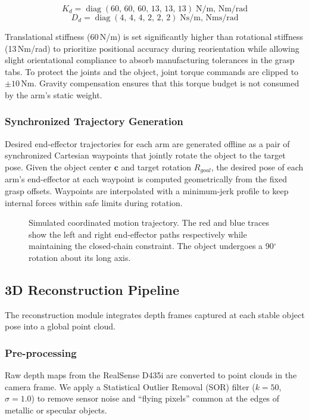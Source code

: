 \documentclass[letterpaper, 10 pt, conference]{ieeeconf}  %
\begin{document}
\begin{equation}
    K_d = \operatorname{diag}(60,\,60,\,60,\,13,\,13,\,13)\;\text{N/m, Nm/rad}
\end{equation}
\begin{equation}
    D_d = \operatorname{diag}(4,\,4,\,4,\,2,\,2,\,2)\;\text{Ns/m, Nms/rad}
\end{equation}

Translational stiffness (60\,N/m) is set significantly higher than rotational
stiffness (13\,Nm/rad) to prioritize positional accuracy during reorientation
while allowing slight orientational compliance to absorb manufacturing
tolerances in the grasp tabs. To protect the joints and the object, joint
torque commands are clipped to $\pm 10$\,Nm. Gravity compensation ensures that
this torque budget is not consumed by the arm's static weight.

\subsubsection{Synchronized Trajectory Generation}

Desired end-effector trajectories for each arm are generated offline as a
pair of synchronized Cartesian waypoints that jointly rotate the object to the
target pose. Given the object center $\bm{c}$ and target rotation $R_{goal}$,
the desired pose of each arm's end-effector at each waypoint is computed
geometrically from the fixed grasp offsets. Waypoints are interpolated with a
minimum-jerk profile to keep internal forces within safe limits during
rotation.

\begin{figure}[thpb]
   \centering
   \framebox{\parbox{3in}{}}
   \caption{Simulated coordinated motion trajectory. The red and blue traces
   show the left and right end-effector paths respectively while maintaining
   the closed-chain constraint. The object undergoes a 90$^\circ$ rotation
   about its long axis.}
   \label{fig:motion_plan}
\end{figure}

\subsection{3D Reconstruction Pipeline}

The reconstruction module integrates depth frames captured at each stable
object pose into a global point cloud.

\subsubsection{Pre-processing}
Raw depth maps from the RealSense D435i are converted to point clouds in the
camera frame. We apply a Statistical Outlier Removal (SOR) filter
($k = 50$, $\sigma = 1.0$) to remove sensor noise and ``flying pixels''
common at the edges of metallic or specular objects.
\end{document}
